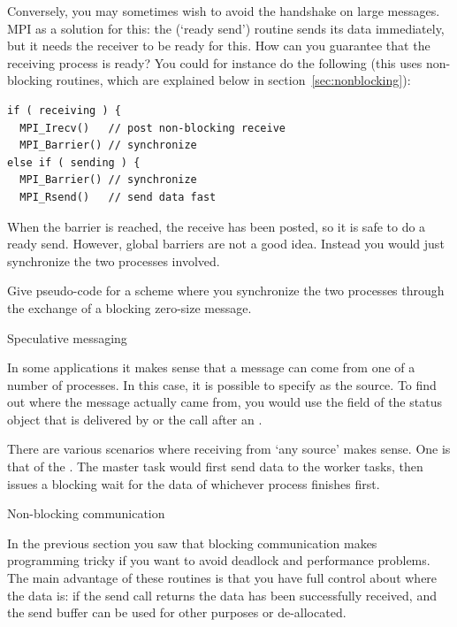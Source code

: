 Conversely, you may sometimes wish to avoid the handshake on large
messages. MPI as a solution for this: the  (`ready
send') routine sends its data immediately, but it needs the receiver
to be ready for this. How can you guarantee that the receiving process
is ready? You could for instance do the following (this uses
non-blocking routines, which are explained below in
section~\ref{sec:nonblocking}):
\begin{verbatim}
if ( receiving ) {
  MPI_Irecv()   // post non-blocking receive
  MPI_Barrier() // synchronize
else if ( sending ) {
  MPI_Barrier() // synchronize
  MPI_Rsend()   // send data fast
\end{verbatim}
When the barrier is reached, the receive has been posted, so it is safe 
to do a ready send. However, global barriers are not a good idea.
Instead you would just synchronize the two processes involved.
\begin{exercise}
  Give pseudo-code for a scheme where you synchronize the two
  processes through the exchange of a blocking zero-size message.
\end{exercise}

 {Speculative messaging}

In some applications it makes sense that a message can come from 
one of a number of processes. In this case, it is possible to specify
 as the source. To find out where the message actually
came from, you would use the  field of the status object
that is delivered by  or the  call after an .

There are various scenarios where receiving from `any source' makes sense.
One is that of the . The master task would first send
data to the worker tasks, then issues a blocking wait for the data of whichever process
finishes first.



 {Non-blocking communication}

In the previous section you saw that blocking communication makes
programming tricky if you want to avoid deadlock and performance
problems. The main advantage of these routines is that you have full
control about where the data is: if the send call returns
the data has been successfully received, and the send buffer can be used for
other purposes or de-allocated.  

